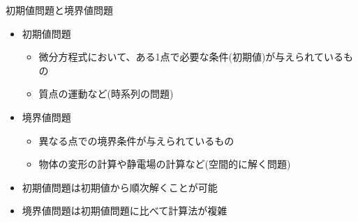 \begin{frame}[t,fragile]{初期値問題と境界値問題}
  \begin{itemize}
  \item 初期値問題
    \begin{itemize}
    \item 微分方程式において、ある1点で必要な条件(初期値)が与えられているもの
    \item 質点の運動など(時系列の問題)
  \end{itemize}
  \item 境界値問題
    \begin{itemize}
    \item 異なる点での境界条件が与えられているもの
    \item 物体の変形の計算や静電場の計算など(空間的に解く問題)
  \end{itemize}
  \item 初期値問題は初期値から順次解くことが可能
  \item 境界値問題は初期値問題に比べて計算法が複雑
  \end{itemize}
\end{frame}
